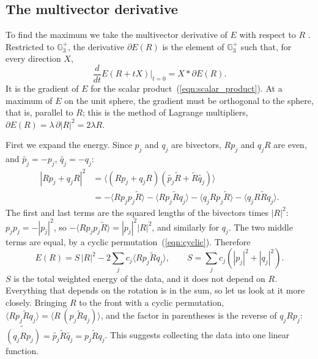 \documentclass{birkjour}
\theoremstyle{definition}
\theoremstyle{remark}
\numberwithin{equation}{section}
\newcommand{\rev}[1]{\widetilde{#1}}
\newcommand{\scal}[1]{\langle #1 \rangle}
\newcommand{\Ge}{\mathbb{G}}
\begin{document}
\subsection{The multivector derivative}

To find the maximum we take the multivector derivative of $E$ with respect to $R$ \cite{HestenesSobczyk1984}. Restricted to $\Ge_3^+$, the derivative $\partial E(R)$ is the element of $\Ge_3^+$ such that, for every direction $X$,
\begin{equation}
\label{eqn:derivative}
\frac{d}{dt} E(R + t X) \Big|_{t=0} = X * \partial E(R).
\end{equation}
It is the gradient of $E$ for the scalar product~(\ref{eqn:scalar_product}). At a maximum of $E$ on the unit sphere, the gradient must be orthogonal to the sphere, that is, parallel to $R$; this is the method of Lagrange multipliers, $\partial E(R) = \lambda\, \partial |R|^2 = 2 \lambda R$.

First we expand the energy. Since $p_j$ and $q_j$ are bivectors, $R p_j$ and $q_j R$ are even, and $\rev{p_j} = -p_j$, $\rev{q_j} = -q_j$:
\begin{align}
|R p_j + q_j R|^2 &= \scal{(R p_j + q_j R)(\rev{p_j} \rev{R} + \rev{R} \rev{q_j})} \nonumber\\
&= -\scal{R p_j p_j \rev{R}} - \scal{R p_j \rev{R} q_j} - \scal{q_j R p_j \rev{R}} - \scal{q_j R \rev{R} q_j}. \label{eqn:expansion}
\end{align}
The first and last terms are the squared lengths of the bivectors times $|R|^2$: $p_j p_j = -|p_j|^2$, so $-\scal{R p_j p_j \rev{R}} = |p_j|^2 |R|^2$, and similarly for $q_j$. The two middle terms are equal, by a cyclic permutation~(\ref{eqn:cyclic}). Therefore
\begin{equation}
\label{eqn:energy_expanded}
E(R) = S\, |R|^2 - 2 \sum_j c_j \scal{R p_j \rev{R} q_j}, \qquad S = \sum_j c_j \left(|p_j|^2 + |q_j|^2\right).
\end{equation}
$S$ is the total weighted energy of the data, and it does not depend on $R$. Everything that depends on the rotation is in the sum, so let us look at it more closely. Bringing $R$ to the front with a cyclic permutation, $\scal{R p_j \rev{R} q_j} = \scal{R\, (p_j \rev{R} q_j)}$, and the factor in parentheses is the reverse of $q_j R p_j$: $\rev{(q_j R p_j)} = \rev{p_j} \rev{R} \rev{q_j} = p_j \rev{R} q_j$. This suggests collecting the data into one linear function.
\end{document}
